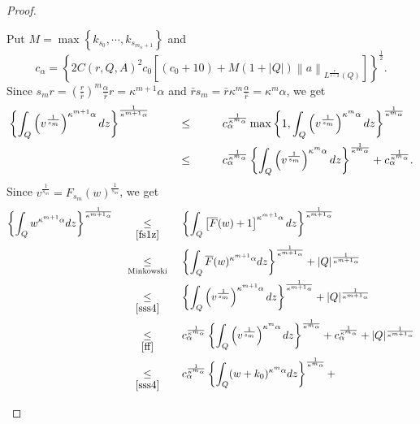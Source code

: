 \documentclass[11pt, a4paper]{article}
\numberwithin{equation}{section}
\newcommand{\coex}[2][\hphantom{longexplanation}]{%
  \underset{{#1}}{\overset{\hphantom{longexplanation}}{#2}}
}
\newcommand{\abs}[1]{\left\lvert #1\right\rvert}
\newcommand{\norm}[1]{\left\lVert #1\right\rVert}
\begin{document}
\begin{proof}
\begin{description}[wide]
Put $M =\max\left\{k_{s_{0}},\cdots,k_{s_{m_{\alpha}+1}}\right\}$ and 
\[
  c_{\alpha}= \left\{ 2C(r,Q,A)^{2}c_{0}
  \left[(c_{0}+10)+M(1+\abs{Q})\norm{a}_{L^{\frac{\overline{r}}{\overline{r}-2}}(Q)}
  \right] \right\}^{\frac{1}{2}}.
\]
Since $s_{m}r= \left(\frac{r}{\bar{r}}
\right)^{m}\frac{\alpha}{\bar{r}}r=\kappa^{m+1}\alpha$ and
$\bar{r}s_{m}= \bar{r} \kappa^m \frac{\alpha}{\bar{r}}=\kappa^{m}\alpha$, we get  
\begin{align}  
  \label{ff}
  \begin{split}
    \left\{\int_{Q}\left( v^{\frac{1}{s_{m}}}
    \right)^{\kappa^{m+1}\alpha}
    dz\right\}^{\frac{1}{\kappa^{m+1}\alpha}}
    &\coex{\le}
      c_{\alpha}^{\frac{1}{\kappa^{m}\alpha}}\max\left\{1,\int_{Q}
      \left(v^{\frac{1}{s_{m}}}
      \right)^{\kappa^{m}\alpha}dz\right\}^{\frac{1}{\kappa^{m}\alpha}}
    \\
    &\coex{\le} c_{\alpha}^{\frac{1}{\kappa^{m}\alpha}}\left\{\int_{Q}
      \left(v^{\frac{1}{s_{m}}} \right)^{\kappa^{m}\alpha}dz\right\}^{\frac{1}{\kappa^{m}\alpha}}+c_{\alpha}^{\frac{1}{\kappa^{m}\alpha}}.
  \end{split}
\end{align} 
Since $v^{\frac{1}{s_{m}}}= F_{s_{m}}(w)^{\frac{1}{s_{m}}}$, we get
\begin{align*}
  \begin{split}
    \left\{\int_{Q}w
    ^{\kappa^{m+1}\alpha} dz\right\}^{\frac{1}{\kappa^{m+1}\alpha}}
    &\coex[\eqref{fs1z}]{\le}
      \left\{\int_{Q} \left[\overline{F}(w)+1 \right]
      ^{\kappa^{m+1}\alpha} dz\right\}^{\frac{1}{\kappa^{m+1}\alpha}}\\
    &\coex[\text{Minkowski}]{\le}
      \left\{\int_{Q}\overline{F}(w)
^{\kappa^{m+1}\alpha} dz\right\}^{\frac{1}{\kappa^{m+1}\alpha}}+
      \abs{Q}^{\frac{1}{\kappa^{m+1}\alpha}}\\
    &\coex[\eqref{sss4}]{\le}
      \left\{\int_{Q} \left(v^{\frac{1}{s_{m}}} \right)^{\kappa^{m+1}\alpha}
      dz\right\}^{\frac{1}{\kappa^{m+1}\alpha}}  +
      \abs{Q}^{\frac{1}{\kappa^{m+1}\alpha}}\\
    &\coex[\eqref{ff}]{\le}
      c_{\alpha}^{\frac{1}{\kappa^{m}\alpha}}\left\{\int_{Q} \left(v^{\frac{1}{s_{m}}} \right)^{\kappa^{m}\alpha}dz\right\}^{\frac{1}{\kappa^{m}\alpha}}+c_{\alpha}^{\frac{1}{\kappa^{m}\alpha}}+
      \abs{Q}^{\frac{1}{\kappa^{m+1}\alpha}}\\
    &\coex[\eqref{sss4}]{\le}
      c_{\alpha}^{\frac{1}{\kappa^{m}\alpha}}\left\{\int_{Q}(w+k_{0})^{\kappa^{m}\alpha}dz\right\}^{\frac{1}{\kappa^{m}\alpha}}+

\end{split}
\end{align*}
\end{description}
\end{proof}
\end{document}
